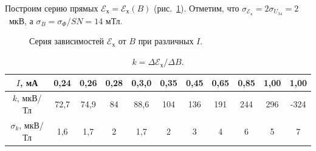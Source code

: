 \documentclass[a4paper,12pt]{article} %
\begin{document}
	Построим серию прямых $\mathscr{E}_\text{х} =\mathscr{E}_\text{х} (B)$ (рис.~\ref{ris:Ex}). Отметим, что $\sigma_{\mathscr{E}_\text{х}} = 2 \sigma_{U_{34}} = 2$~мкВ, а $\sigma_B = \sigma_\Phi / SN = 14$ мТл.
	\begin{figure}[H]
		\caption{Серия зависимостей $\mathscr{E}_\text{х}$ от $B$ при различных $I$.}
		\label{ris:Ex}
	\end{figure}
\newpage
		\begin{table}[H]
		\caption{$k = \Delta \mathscr{E}_\text{х} / \Delta B $.}
		\label{table:k}
		\begin{tabular}{|c|c|c|c|c|c|c|c|c|c|c|}
			\hline
			$I$, мА            & 0,24 & 0,26 & 0,28 & 0,3,0 & 0,35 & 0,45 & 0,65 & 0,85 & 1,00 & 1,00 \\ \hline
			$k$, мкВ/Тл        & 72,7 & 74,9 & 84   & 88,6  & 104  & 136  & 191  & 244  & 296  & -324 \\ \hline
			$\sigma_k$, мкВ/Тл & 1,6  & 1,7  & 2    & 1,7   & 2    & 3    & 4    & 6    & 5    & 7    \\ \hline
		\end{tabular}
	\end{table}
\end{document}
